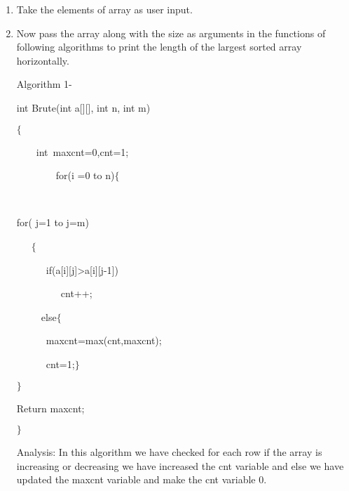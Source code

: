 \documentclass[12pt]{report}
\renewcommand{\_}{\kern-1.5pt\textunderscore\kern-1.5pt}
\begin{document}
\begin{multicols}{2}
\begin{enumerate}
	\item Take the elements of array as user input.\par

	\item Now pass the array along with the size as arguments in the functions of following algorithms to print the length of the largest sorted array horizontally.\par


\vspace{\baselineskip}
Algorithm 1-\par

int Brute(int a[][], int n, int m)\par

$ \{ $ \par

\ \ \ \ int\ max\_cnt=0,cnt=1;\    \par

\ \ \ \ \ \ \ \ for(i =0 to  n)$ \{ $ \par

\ \ \  \tab \par

for( j=1 to j=m)\par

\ \ \  \tab $ \{ $ \par

\ \ \  \tab \ \ \  if(a[i][j]>a[i][j-1])\par

\ \ \  \tab \ \ \ \ \ \  cnt++;\par

\ \ \  \tab \ \  else$ \{ $ \par

\ \ \  \tab \ \ \  max\_cnt=max(cnt,max\_cnt);\par

\ \ \  \tab \ \ \  cnt=1;$ \} $ \par

\tab $ \} $ \par

Return max\_cnt;\par

$ \} $ \par


\vspace{\baselineskip}
Analysis: In this algorithm we have checked for each row if the array is increasing or decreasing we have increased the cnt variable and else we have updated the max\_cnt variable and make the cnt variable 0.\par



\end{enumerate}
\end{multicols}
\end{document}
